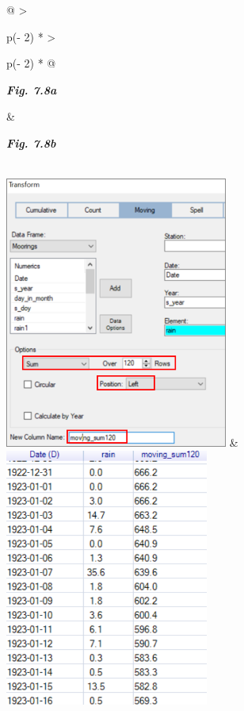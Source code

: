 \documentclass[
  letterpaper,
  DIV=11,
  numbers=noendperiod]{scrreprt}
\begin{document}
\begin{longtable}[]{@{}
  >{\raggedright\arraybackslash}p{(\columnwidth - 2\tabcolsep) * }
  >{\raggedright\arraybackslash}p{(\columnwidth - 2\tabcolsep) * }@{}}
\toprule\noalign{}
\begin{minipage}[b]{\linewidth}\raggedright
\textbf{\emph{Fig. 7.8a}}
\end{minipage} & \begin{minipage}[b]{\linewidth}\raggedright
\textbf{\emph{Fig. 7.8b}}
\end{minipage} \\
\midrule\noalign{}
\endhead
\bottomrule\noalign{}
\endlastfoot
\includegraphics[width=2.88645in,height=3.5359in]{figures/Fig7.8a.png} &
\includegraphics[width=2.63197in,height=3.3305in]{figures/Fig7.8b.png} \\
\end{longtable}
\end{document}
